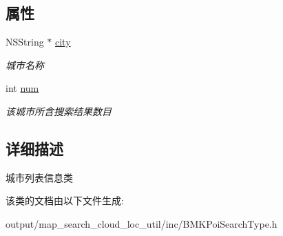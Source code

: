\subsection*{属性}
\begin{DoxyCompactItemize}
\item 
\hypertarget{interface_b_m_k_city_list_info_ad1b2093344ad0524a9bef93c823f8242}{N\+S\+String $\ast$ \hyperlink{interface_b_m_k_city_list_info_ad1b2093344ad0524a9bef93c823f8242}{city}}\label{interface_b_m_k_city_list_info_ad1b2093344ad0524a9bef93c823f8242}

\begin{DoxyCompactList}\small\item\em 城市名称 \end{DoxyCompactList}\item 
\hypertarget{interface_b_m_k_city_list_info_a63163c524339e1687d90541b3a24b54c}{int \hyperlink{interface_b_m_k_city_list_info_a63163c524339e1687d90541b3a24b54c}{num}}\label{interface_b_m_k_city_list_info_a63163c524339e1687d90541b3a24b54c}

\begin{DoxyCompactList}\small\item\em 该城市所含搜索结果数目 \end{DoxyCompactList}\end{DoxyCompactItemize}


\subsection{详细描述}
城市列表信息类 

该类的文档由以下文件生成\+:\begin{DoxyCompactItemize}
\item 
output/map\+\_\+search\+\_\+cloud\+\_\+loc\+\_\+util/inc/B\+M\+K\+Poi\+Search\+Type.\+h\end{DoxyCompactItemize}
